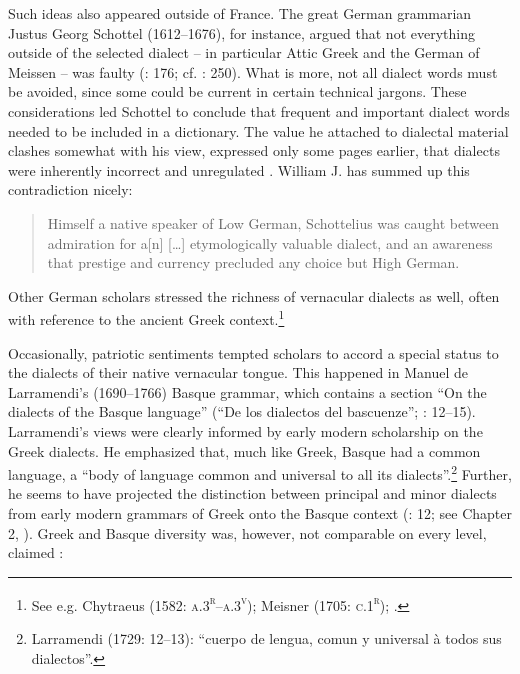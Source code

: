 Such ideas also appeared outside of France. The great German grammarian Justus Georg Schottel (1612–1676), for instance, argued that not everything outside of the selected dialect – in particular Attic Greek and the German of Meissen – was faulty (\citealt{Schottel1663}: 176; cf. \citealt{Roelcke2014}: 250). What is more, not all dialect words must be avoided, since some could be current in certain technical jargons. These considerations led Schottel to conclude that frequent and important dialect words needed to be included in a dictionary. The value he attached to dialectal material clashes somewhat with his view, expressed only some pages earlier, that dialects were inherently incorrect and unregulated \citep[174]{Schottel1663}. William J. \citet[1110]{Jones2001} has summed up this contradiction nicely:

\begin{quote}
Himself a native speaker of Low German, Schottelius was caught between admiration for a[n] […] etymologically valuable dialect, and an awareness that prestige and currency precluded any choice but High German.
\end{quote}

Other German scholars stressed the richness of vernacular dialects as well, often with reference to the ancient Greek context.\footnote{See e.g. Chytraeus (1582: \textsc{a.3}\textsc{\textsuperscript{r}}\textsc{–a.3}\textsc{\textsuperscript{v}}); Meisner (1705: \textsc{c.1}\textsc{\textsuperscript{r}}); \citet[73]{Hertling1708}.}

Occasionally, patriotic sentiments tempted scholars to accord a special status to the dialects of their native vernacular tongue. This happened in Manuel de Larramendi’s (1690–1766) Basque grammar, which contains a section “On the dialects of the Basque language” (“De los dialectos del bascuenze”; \citealt{Larramendi1729}: 12–15). Larramendi’s views were clearly informed by early modern scholarship on the Greek dialects. He emphasized that, much like Greek, Basque had a common language, a “body of language common and universal to all its dialects”.\footnote{Larramendi (1729: 12–13): “cuerpo de lengua, comun y universal à todos sus dialectos”.} Further, he seems to have projected the distinction between principal and minor dialects from early modern grammars of Greek onto the Basque context (\citealt{Larramendi1729}: 12; see Chapter 2, ). Greek and Basque diversity was, however, not comparable on every level, claimed \citet[12]{Larramendi1729}:

